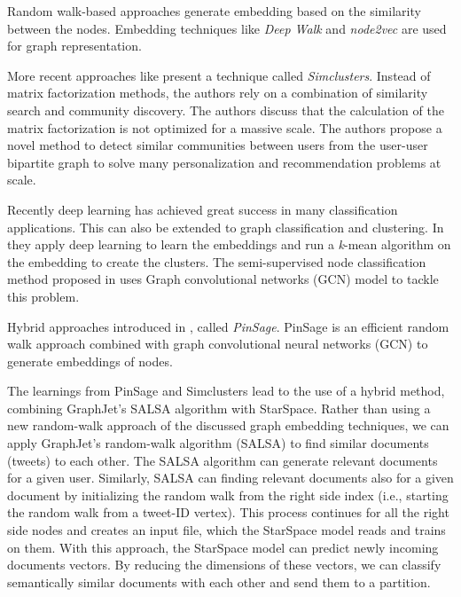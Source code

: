 Random walk-based approaches generate embedding based on the similarity between the nodes. Embedding techniques like \emph{Deep Walk} \cite{perozziDeepWalkOnlineLearning2014} and \emph{node2vec} \cite{groverNode2vecScalableFeature2016} are used for graph representation.


More recent approaches like \cite{satuluriSimClustersCommunityBasedRepresentations2020} present a technique called \emph{Simclusters}. Instead of matrix factorization methods, the authors rely on a combination of similarity search and community discovery. The authors discuss that the calculation of the matrix factorization is not optimized for a massive scale. The authors propose a novel method to detect similar communities between users from the user-user bipartite graph to solve many personalization and recommendation problems at scale.


Recently deep learning has achieved great success in many classification applications. This can also be extended to graph classification and clustering. In \cite{tianLearningDeepRepresentations2014} they apply deep learning to learn the embeddings and run a \emph{k}-mean algorithm on the embedding to create the clusters. The semi-supervised node classification method proposed in \cite{kipfSemiSupervisedClassificationGraph2017} uses Graph convolutional networks (GCN) model to tackle this problem. 

Hybrid approaches introduced in \cite{yingGraphConvolutionalNeural2018}, called \emph{PinSage}. PinSage is an efficient random walk approach combined with graph convolutional neural networks (GCN) to generate embeddings of nodes.


The learnings from PinSage and Simclusters lead to the use of a hybrid method, combining GraphJet's SALSA algorithm with StarSpace. Rather than using a new random-walk approach of the discussed graph embedding techniques, we can apply GraphJet's random-walk algorithm (SALSA) to find similar documents (tweets) to each other. The SALSA algorithm can generate relevant documents for a given user. Similarly, SALSA can finding relevant documents also for a given document by initializing the random walk from the right side index (i.e., starting the random walk from a tweet-ID vertex). This process continues for all the right side nodes and creates an input file, which the StarSpace model reads and trains on them. With this approach, the StarSpace model can predict newly incoming documents vectors. By reducing the dimensions of these vectors, we can classify semantically similar documents with each other and send them to a partition.

